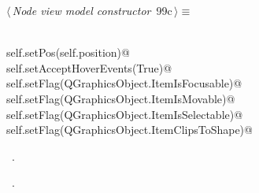 \documentclass[
    a4paper,      %
    10pt,         %
    openright,    %
    notitlepage,  %
    parskip=half, %
]{scrreprt}       %
\theoremstyle{definition}                    %
\begin{document}
\begin{flushleft} \small
\begin{minipage}{\linewidth}\label{scrap161}\raggedright\small
{} $\langle\,${\itshape Node view model constructor}\nobreak\ {\footnotesize {99c}}$\,\rangle\equiv$
\vspace{-1exm}
\begin{list}{}{} \item
\mbox{}\lstinline@@\\
\mbox{}\lstinline@    self.setPos(self.position)@\\
\mbox{}\lstinline@    self.setAcceptHoverEvents(True)@\\
\mbox{}\lstinline@    self.setFlag(QGraphicsObject.ItemIsFocusable)@\\
\mbox{}\lstinline@    self.setFlag(QGraphicsObject.ItemIsMovable)@\\
\mbox{}\lstinline@    self.setFlag(QGraphicsObject.ItemIsSelectable)@\\
\mbox{}\lstinline@    self.setFlag(QGraphicsObject.ItemClipsToShape)@\\
\mbox{}\lstinline@@{\NWsep}
\end{list}
\vspace{-1.5ex}
\footnotesize
\begin{list}{}{\setlength{\itemsep}{-\parsep}\setlength{\itemindent}{-\leftmargin}}
\item \NWtxtMacroDefBy\ .
\item \NWtxtMacroRefIn\ .

\item{}
\end{list}
\end{minipage}\vspace{4ex}
\end{flushleft}
\end{document}
